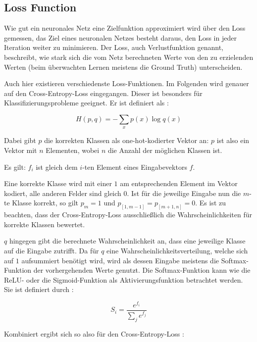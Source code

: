 \subsection{Loss Function}
\label{ssec:loss}

Wie gut ein neuronales Netz eine Zielfunktion approximiert wird über den Loss gemessen, \dahe das Ziel eines neuronalen Netzes besteht daraus, den Loss in jeder Iteration weiter zu minimieren. Der Loss, auch Verlustfunktion genannt, beschreibt, wie stark sich die vom Netz berechneten Werte von den zu erzielenden Werten (beim überwachten Lernen meistens die Ground Truth) unterscheiden.

Auch hier existieren verschiedenste Loss-Funktionen. Im Folgenden wird genauer auf den Cross-Entropy-Loss eingegangen. Dieser ist besonders für Klassifizierungsprobleme geeignet. Er ist definiert als \cite{cs231n}:

\begin{equation}
H(p,q) = -\sum_x p(x)\log q(x)
\end{equation}

Dabei gibt $p$ die korrekten Klassen als one-hot-kodierter Vektor an: $p$ ist also ein Vektor mit $n$ Elementen, wobei $n$ die Anzahl der möglichen Klassen ist. 

Es gilt: $f_i$ ist gleich dem $i$-ten Element eines Eingabevektors $f$.

Eine korrekte Klasse wird mit einer $1$ am entsprechenden Element im Vektor kodiert, alle anderen Felder sind gleich $0$. Ist für die jeweilige Eingabe nun \bspw die $m$-te Klasse korrekt, so gilt $p_m=1$ und $p_{\left[1,m-1\right]} = p_{\left[m+1,n\right]} = 0$. Es ist zu beachten, dass der Cross-Entropy-Loss ausschließlich die Wahrscheinlichkeiten für korrekte Klassen bewertet.

$q$ hingegen gibt die berechnete Wahrscheinlichkeit an, dass eine jeweilige Klasse auf die Eingabe zutrifft. Da für $q$ eine Wahrscheinlichkeitsverteilung, welche sich auf $1$ aufsummiert benötigt wird, wird als dessen Eingabe meistens die Softmax-Funktion der vorhergehenden Werte genutzt. Die Softmax-Funktion kann wie die ReLU- oder die Sigmoid-Funktion als Aktivierungsfunktion betrachtet werden. Sie ist definiert durch \cite{cs231n}:

\begin{equation}
S_i=\frac{e^{f_i}}{\sum_j e^{f_j}}
\end{equation}

Kombiniert ergibt sich so also für den Cross-Entropy-Loss \cite{cs231n}:

